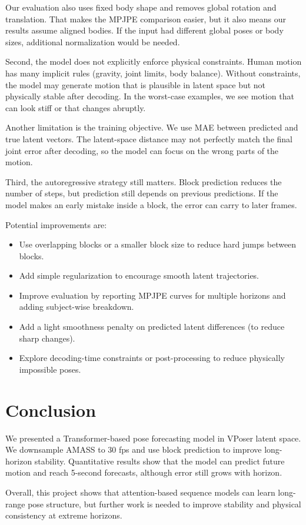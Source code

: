 \documentclass[10pt,twocolumn]{article}
\begin{document}
Our evaluation also uses fixed body shape and removes global rotation and translation.
That makes the MPJPE comparison easier, but it also means our results assume aligned bodies.
If the input had different global poses or body sizes, additional normalization would be needed.

Second, the model does not explicitly enforce physical constraints.
Human motion has many implicit rules (gravity, joint limits, body balance).
Without constraints, the model may generate motion that is plausible in latent space but not physically stable after decoding.
In the worst-case examples, we see motion that can look stiff or that changes abruptly.

Another limitation is the training objective.
We use MAE between predicted and true latent vectors.
The latent-space distance may not perfectly match the final joint error after decoding, so the model can focus on the wrong parts of the motion.

Third, the autoregressive strategy still matters.
Block prediction reduces the number of steps, but prediction still depends on previous predictions.
If the model makes an early mistake inside a block, the error can carry to later frames.

Potential improvements are:
\begin{itemize}[noitemsep,topsep=2pt]
  \item Use overlapping blocks or a smaller block size to reduce hard jumps between blocks.
  \item Add simple regularization to encourage smooth latent trajectories.
  \item Improve evaluation by reporting MPJPE curves for multiple horizons and adding subject-wise breakdown.
  \item Add a light smoothness penalty on predicted latent differences (to reduce sharp changes).
  \item Explore decoding-time constraints or post-processing to reduce physically impossible poses.
\end{itemize}

\section{Conclusion}
We presented a Transformer-based pose forecasting model in VPoser latent space.
We downsample AMASS to 30 fps and use block prediction to improve long-horizon stability.
Quantitative results show that the model can predict future motion and reach 5-second forecasts, although error still grows with horizon.

Overall, this project shows that attention-based sequence models can learn long-range pose structure,
but further work is needed to improve stability and physical consistency at extreme horizons.
\end{document}
